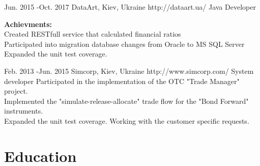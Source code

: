 \documentclass[10pt]{article} %
\begin{document}
\job
{Jun. 2015 -}{Oct. 2017}
{DataArt, Kiev, Ukraine}
{http://dataart.ua/}
{Java Developer}
{

\textbf{Achievments:}  
\\Created RESTfull service that calculated financial ratios
\\Participated into migration database changes from Oracle to MS SQL Server
\\Expanded the unit test coverage.
 }

\job
{Feb. 2013 -}{Jun. 2015}
{Simcorp, Kiev, Ukraine}
{http://www.simcorp.com/}
{System developer}
{Participated in the implementation of the OTC "Trade Manager" project. 
\\Implemented the "simulate-release-allocate" trade flow for the "Bond Forward" instruments. 
\\Expanded the unit test coverage. Working with the customer specific requests. \\
 }


\section{Education}

\end{document}
